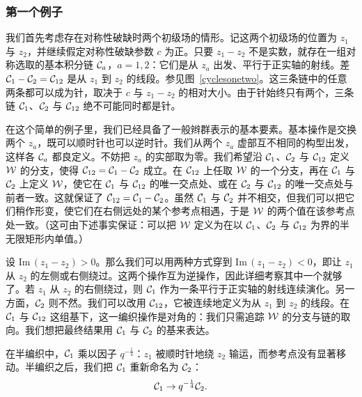 \subsubsection{第一个例子}\label{twop}

我们首先考虑存在对称性破缺时两个初级场的情形。记这两个初级场的位置为 $z_1$ 与 $z_2$，并继续假定对称性破缺参数 $c$ 为正。只要 $z_1-z_2$ 不是实数，就存在一组对称选取的基本积分链 ${\mathcal C}_a$，$a=1,2$：它们是从 $z_a$ 出发、平行于正实轴的射线。差 ${\mathcal C}_1 - {\mathcal C}_2= {\mathcal C}_{12}$ 是从 $z_1 $ 到 $z_2$ 的线段。参见图~\ref{cyclesonetwo}。这三条链中的任意两条都可以成为针，取决于 $c$ 与 $z_1 - z_2$ 的相对大小。由于针始终只有两个，三条链 ${\mathcal C}_1$、${\mathcal C}_2$ 与 ${\mathcal C}_{12}$ 绝不可能同时都是针。

在这个简单的例子里，我们已经具备了一般辫群表示的基本要素。基本操作是交换两个 $z_a$，既可以顺时针也可以逆时针。我们从两个 $z_a$ 虚部互不相同的构型出发，这样各 ${\mathcal C}_a$ 都良定义。不妨把 $z_a$ 的实部取为零。我们希望沿 ${\mathcal C}_1$、${\mathcal C}_2$ 与 ${\mathcal C}_{12}$ 定义 ${\mathcal W}$ 的分支，使得 ${\mathcal C}_{12}={\mathcal C}_1-{\mathcal C}_2$ 成立。在 ${\mathcal C}_{12}$ 上任取 ${\mathcal W}$ 的一个分支，再在 ${\mathcal C}_1$ 与 ${\mathcal C}_2$ 上定义 ${\mathcal W}$，使它在 ${\mathcal C}_1$ 与 ${\mathcal C}_{12}$ 的唯一交点处、或在 ${\mathcal C}_2$ 与 ${\mathcal C}_{12}$ 的唯一交点处与前者一致。这就保证了 ${\mathcal C}_{12}={\mathcal C}_1-{\mathcal C}_2$。虽然 ${\mathcal C}_1$ 与 ${\mathcal C}_2$ 并不相交，但我们可以把它们稍作形变，使它们在右侧远处的某个参考点相遇，于是 ${\mathcal W}$ 的两个值在该参考点处一致。（这可由下述事实保证：可以把 ${\mathcal W}$ 定义为在以 ${\mathcal C}_1$、${\mathcal C}_2$ 与 ${\mathcal C}_{12}$ 为界的半无限矩形内单值。）


设 $\mathrm{Im}\,( z_1-z_2)>0$。那么我们可以用两种方式穿到 $\mathrm{Im}\,( z_1-z_2)<0$，即让 $z_1$ 从 $z_2$ 的左侧或右侧绕过。这两个操作互为逆操作，因此详细考察其中一个就够了。若 $z_1$ 从 $z_2$ 的右侧绕过，则 ${\mathcal C}_1$ 作为一条平行于正实轴的射线连续演化。另一方面，${\mathcal C}_2$ 则不然。我们可以改用 ${\mathcal C}_{12}$，它被连续地定义为从 $z_1$ 到 $z_2$ 的线段。在 ${\mathcal C}_1$ 与 ${\mathcal C}_{12}$ 这组基下，这一编织操作是对角的：我们只需追踪 ${\mathcal W}$ 的分支与链的取向。我们想把最终结果用 ${\mathcal C}_1$ 与 ${\mathcal C}_2$ 的基来表达。

在半编织中，${\mathcal C}_1$ 乘以因子 $q^{-\frac{1}{4}}$：$z_1$ 被顺时针地绕 $z_2$ 输运，而参考点没有显著移动。半编织之后，我们把 ${\mathcal C}_1$ 重新命名为 ${\mathcal C}_2$：
\begin{equation}\label{elfin}
{\mathcal C}_1 \to q^{-\frac{1}{4}} {\mathcal C}_2.
\end{equation}

